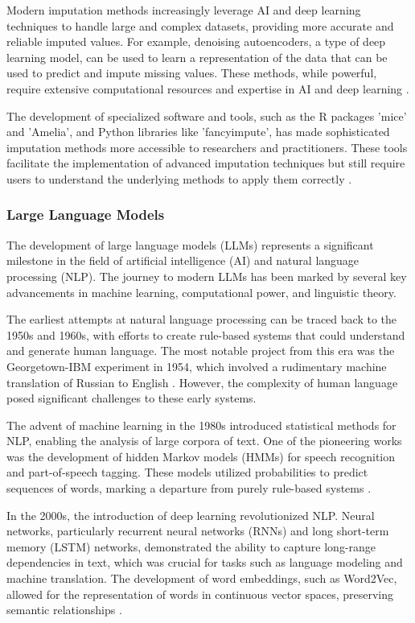 Modern imputation methods increasingly leverage AI and deep learning techniques to handle large and complex datasets, providing more accurate and reliable imputed values. For example, denoising autoencoders, a type of deep learning model, can be used to learn a representation of the data that can be used to predict and impute missing values. These methods, while powerful, require extensive computational resources and expertise in AI and deep learning \cite{gondara2018mida}.

The development of specialized software and tools, such as the R packages 'mice' and 'Amelia', and Python libraries like 'fancyimpute', has made sophisticated imputation methods more accessible to researchers and practitioners. These tools facilitate the implementation of advanced imputation techniques but still require users to understand the underlying methods to apply them correctly \cite{Buuren2011MICEMI, Honaker2011AmeliaIA}.


\subsubsection*{Large Language Models}

The development of large language models (LLMs) represents a significant milestone in the field of artificial intelligence (AI) and natural language processing (NLP). The journey to modern LLMs has been marked by several key advancements in machine learning, computational power, and linguistic theory.

The earliest attempts at natural language processing can be traced back to the 1950s and 1960s, with efforts to create rule-based systems that could understand and generate human language. The most notable project from this era was the Georgetown-IBM experiment in 1954, which involved a rudimentary machine translation of Russian to English \cite{hutchins2004georgetown}. However, the complexity of human language posed significant challenges to these early systems.

The advent of machine learning in the 1980s introduced statistical methods for NLP, enabling the analysis of large corpora of text. One of the pioneering works was the development of hidden Markov models (HMMs) for speech recognition and part-of-speech tagging. These models utilized probabilities to predict sequences of words, marking a departure from purely rule-based systems \cite{rabiner1989tutorial}.

In the 2000s, the introduction of deep learning revolutionized NLP. Neural networks, particularly recurrent neural networks (RNNs) and long short-term memory (LSTM) networks, demonstrated the ability to capture long-range dependencies in text, which was crucial for tasks such as language modeling and machine translation. The development of word embeddings, such as Word2Vec, allowed for the representation of words in continuous vector spaces, preserving semantic relationships \cite{mikolov2013efficient}.

